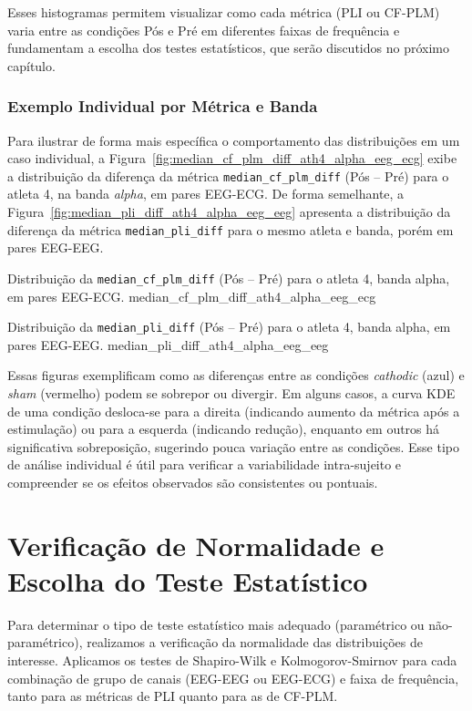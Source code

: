 Esses histogramas permitem visualizar como cada métrica (PLI ou CF-PLM) varia entre as condições Pós e Pré em diferentes faixas de frequência e fundamentam a escolha dos testes estatísticos, que serão discutidos no próximo capítulo.

\subsubsection{Exemplo Individual por Métrica e Banda}
Para ilustrar de forma mais específica o comportamento das distribuições em um caso individual, a Figura~\ref{fig:median_cf_plm_diff_ath4_alpha_eeg_ecg} exibe a distribuição da diferença da métrica \texttt{median\_cf\_plm\_diff} (Pós -- Pré) para o atleta 4, na banda \emph{alpha}, em pares EEG-ECG. De forma semelhante, a Figura~\ref{fig:median_pli_diff_ath4_alpha_eeg_eeg} apresenta a distribuição da diferença da métrica \texttt{median\_pli\_diff} para o mesmo atleta e banda, porém em pares EEG-EEG.

{Distribuição da \texttt{median\_cf\_plm\_diff} (Pós -- Pré) para o atleta 4, banda alpha, em pares EEG-ECG.}
{median_cf_plm_diff_ath4_alpha_eeg_ecg}

{Distribuição da \texttt{median\_pli\_diff} (Pós -- Pré) para o atleta 4, banda alpha, em pares EEG-EEG.}
{median_pli_diff_ath4_alpha_eeg_eeg}

Essas figuras exemplificam como as diferenças entre as condições \emph{cathodic} (azul) e \emph{sham} (vermelho) podem se sobrepor ou divergir. Em alguns casos, a curva KDE de uma condição desloca-se para a direita (indicando aumento da métrica após a estimulação) ou para a esquerda (indicando redução), enquanto em outros há significativa sobreposição, sugerindo pouca variação entre as condições. Esse tipo de análise individual é útil para verificar a variabilidade intra-sujeito e compreender se os efeitos observados são consistentes ou pontuais.

\section{Verificação de Normalidade e Escolha do Teste Estatístico}

Para determinar o tipo de teste estatístico mais adequado (paramétrico ou não-paramétrico), realizamos a verificação da normalidade das distribuições de interesse. Aplicamos os testes de Shapiro-Wilk e Kolmogorov-Smirnov para cada combinação de grupo de canais (EEG-EEG ou EEG-ECG) e faixa de frequência, tanto para as métricas de PLI quanto para as de CF-PLM.

